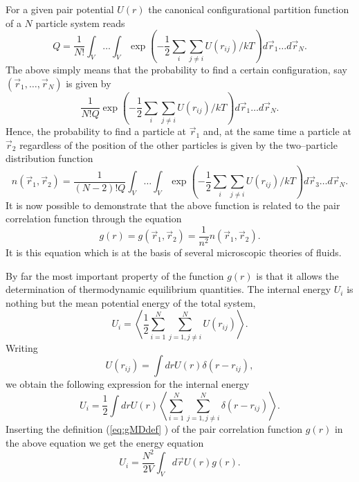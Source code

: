 For a given pair potential $U(r)$ the canonical configurational 
partition function of a $N$ particle system reads
\begin{displaymath}
  Q = \frac{1}{N!} \int_V \ldots \int_V
  \exp\left(
     - \frac{1}{2} \sum_i \sum_{j \neq i} U(r_{ij})/kT \right) 
          d\vec{r}_1 \ldots d\vec{r}_N.
\end{displaymath}
The above simply means that the probability to find a certain configuration, 
say $(\vec{r}_1, \ldots, \vec{r}_N)$ is given by
\begin{displaymath}
  \frac{1}{N!Q} 
  \exp\left(
     - \frac{1}{2} \sum_i \sum_{j \neq i} U(r_{ij})/kT \right) 
          d\vec{r}_1 \ldots d\vec{r}_N .
\end{displaymath}
Hence, the probability to find a particle at $\vec{r}_1$ and, at the same time
a particle at $\vec{r}_2$ regardless of the position of the other particles
is given by the two--particle distribution function
\begin{displaymath}
  n(\vec{r}_1, \vec{r}_2) = \frac{1}{(N-2)! Q}
      \int_V \ldots \int_V
  \exp\left(
     - \frac{1}{2} \sum_i \sum_{j \neq i} U(r_{ij})/kT \right)
          d\vec{r}_3 \ldots d\vec{r}_N.    
\end{displaymath}
It is now possible to demonstrate that the above function is related to the
pair correlation function through the equation
\begin{displaymath}
  g(r) = g(\vec{r}_1, \vec{r}_2) = \frac{1}{n^2}  n(\vec{r}_1, \vec{r}_2).
\end{displaymath}
It is this equation which is at the basis of several microscopic theories of
fluids. 

By far the most important
property of the function $g(r)$ is that it allows the determination  of
thermodynamic equilibrium quantities. The internal energy $U_i$ is 
nothing but the mean potential energy of the total system,
\begin{displaymath}
  U_i = \left\langle 
         \frac{1}{2} \sum_{i=1}^N \sum_{j=1, j \neq i}^N 
                       U(r_{ij}) 
         \right\rangle.
\end{displaymath}
Writing
\begin{displaymath}
  U(r_{ij}) = \int dr U(r) \delta(r- r_{ij}),
\end{displaymath}
we obtain the following expression for the internal energy
\begin{displaymath}
  U_i = \frac{1}{2} \int dr U(r)  
            \left\langle \sum_{i=1}^N \sum_{j=1, j \neq i}^N 
                      \delta(r- r_{ij})
            \right\rangle.        
\end{displaymath}
Inserting the definition (\ref{eq:gMDdef} ) 
of the pair correlation function $g(r)$ in the above
equation we get the energy equation 
\begin{displaymath}
  U_i = \frac{N^2}{2V} \int_V d\vec{r} U(r) g(r).
\end{displaymath}
 
